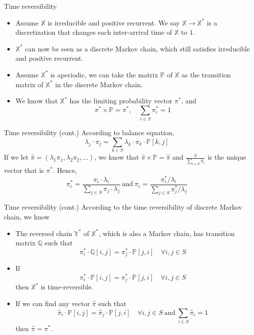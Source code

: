 \documentclass[mathserif]{beamer}
\begin{document}
\begin{frame}{Time reversibility}
\begin{itemize}
\item Assume $\mathbb{X}$ is irreducible and positive recurrent.
We say $\mathbb{X} \to \mathbb{X}^*$ is a discretization that changes each inter-arrival time of $\mathbb{X}$ to $1$.
\item $\mathbb{X}^*$ can now be seen as a discrete Markov chain, which still satisfies irreducible and positive recurrent.
\item Assume $\mathbb{X}^*$ is aperiodic, we can take the matrix $\mathbb{P}$ of $\mathbb{X}$ as the transition matrix of $\mathbb{X}^*$ in the discrete Markov chain.
\item We know that $\mathbb{X}^*$ has the limiting probability vector $\pi^*$, and
\[
\pi^*\times \mathbb{P} = \pi^*, \quad \sum_{i\in S} \pi_i^* = 1
\]
\end{itemize}
\end{frame}

\begin{frame}{Time reversibility (cont.)}
According to balance equation,
\[
\lambda_j\cdot \pi_j = \sum_{k\in S} \lambda_k\cdot \pi_k\cdot \mathbb{P}[k,j]
\]
If we let $\hat{\pi} = (\lambda_1 \pi_1, \lambda_2 \pi_2, \ldots)$, we know that
$\hat{\pi}\times \mathbb{P} = \hat{\pi}$ and $\frac{\hat{\pi}}{\sum_{i\in S} \hat{\pi}_i}$ is the unique vector that is $\pi^*$. Hence,
\[
\pi_i^* = \frac{\pi_i\cdot \lambda_i}{\sum_{j\in S} \pi_j\cdot \lambda_j} ~\text{and}~
\pi_i = \frac{\pi_i^* / \lambda_i}{\sum_{j\in S} \pi_j^* / \lambda_j}
\]
\end{frame}

\begin{frame}{Time reversibility (cont.)}
According to the time reversibility of discrete Markov chain, we know
\begin{itemize}
\item The reversed chain $\mathbb{Y}^*$ of $\mathbb{X}^*$, which is also a Markov chain, has transition matrix $\mathbb{Q}$ such that
\[
\pi_i^*\cdot \mathbb{Q}[i,j] = \pi_j^*\cdot \mathbb{P}[j,i] \quad\forall i,j \in S
\]
\item If
\[
\pi_i^*\cdot \mathbb{P}[i,j] = \pi_j^*\cdot \mathbb{P}[j,i] \quad\forall i,j \in S
\]
then $\mathbb{X}^*$ is time-reversible.
\item If we can find any vector $\hat{\pi}$ such that
\[
\hat{\pi}_i\cdot \mathbb{P}[i,j] = \hat{\pi}_j\cdot \mathbb{P}[j,i] \quad\forall i,j \in S ~\text{and}~
\sum_{i\in S} \hat{\pi}_i = 1
\]
then $\hat{\pi} = \pi^*$.
\end{itemize}
\end{frame}
\end{document}
